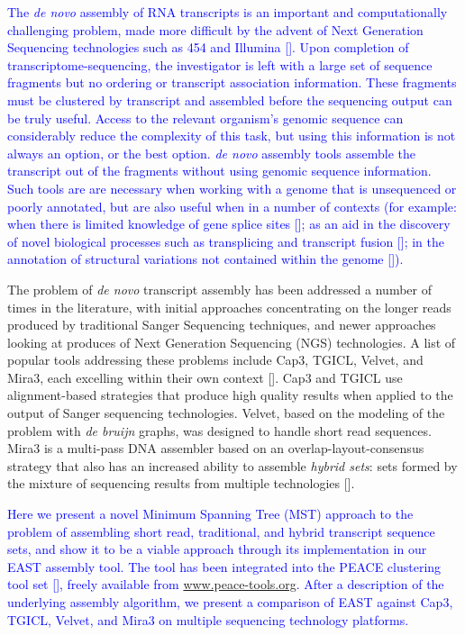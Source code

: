 \documentclass{bioinfo}
\newcommand{\peace} {{\small PEACE}}
\newcommand{\capthree} {{\small Cap3}}
\newcommand{\tgicl} {{\small TGICL}}
\newcommand{\east} {{\small EAST}}
\newcommand{\velvet}{{\small Velvet}}
\newcommand{\mira}{{\small Mira3}}
\begin{document}
\textcolor{blue}{The {\it de novo} assembly of RNA transcripts is an important and
computationally challenging problem, made more difficult by the advent
of Next Generation Sequencing technologies such as 454 and Illumina
[\cite{Nagaraj07}].  Upon completion of transcriptome-sequencing, the
investigator is left with a large set of sequence fragments but no
ordering or transcript association information.  These fragments must
be clustered by transcript and assembled before the sequencing output
can be truly useful.  Access to the relevant organism's genomic
sequence can considerably reduce the complexity of this task, but
using this information is not always an option, or the best option.
{\it de novo} assembly tools assemble the transcript out of the
fragments without using genomic sequence information.  Such tools are
are necessary when working with a genome that is unsequenced
or poorly annotated, but are also useful when in a number of contexts
(for example: when there is limited knowledge of gene splice sites
[\cite{Birol09,Robertson10}]; as an aid in the discovery of novel
biological processes such as transplicing and transcript fusion
[\cite{Mitelman07,Li10b}]; in the annotation of structural variations
not contained within the genome [\cite{Li08}]).}


The problem of {\it de novo} transcript assembly has been addressed a
number of times in the literature, with initial approaches
concentrating on the longer reads produced by traditional Sanger
Sequencing techniques, and newer approaches looking at produces of
Next Generation Sequencing (NGS) technologies.  A list of popular
tools addressing these problems include \capthree, \tgicl, \velvet,
and \mira, each excelling within their own context
[\cite{Huang99,Pertea03,Chevreux04,Zerbino08}].  \capthree\/ and
\tgicl\/ use alignment-based strategies that produce high quality
results when applied to the output of Sanger sequencing technologies.
\velvet, based on the modeling of the problem with {\it de bruijn}
graphs, was designed to handle short read sequences.  \mira\/ is a
multi-pass DNA assembler based on an overlap-layout-consensus strategy
that also has an increased ability to assemble {\it hybrid sets}: sets
formed by the mixture of sequencing results from multiple technologies
[\cite{MiraWeb}].


\textcolor{blue}{Here we present a novel Minimum Spanning Tree (MST) approach to the
problem of assembling short read, traditional, and hybrid transcript
sequence sets, and show it to be a viable approach through its
implementation in our \east\/ assembly tool.  The tool has been
integrated into the \peace\/ clustering tool set [\cite{Rao10}],
freely available from \url{www.peace-tools.org}.  After a description
of the underlying assembly algorithm, we present a comparison of
\east\/ against \capthree, \tgicl, \velvet, and \mira\/ on multiple
sequencing technology platforms.}
\end{document}
